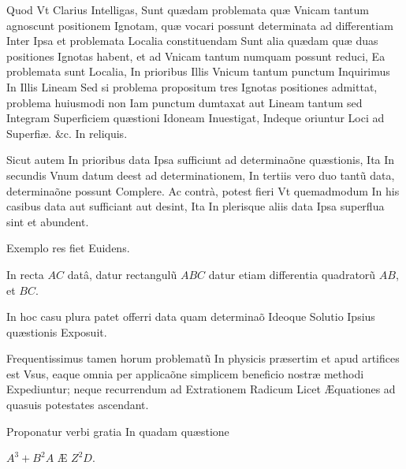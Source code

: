 \documentclass[11pt,a4paper]{article}
\begin{document}
Quod Vt Clarius Intelligas, Sunt quædam problemata quæ Vnicam tantum agnoscunt positionem Ignotam, quæ vocari possunt determinata ad differentiam Inter Ipsa et problemata Localia constituendam Sunt alia quædam quæ duas positiones Ignotas habent, et ad Vnicam tantum numquam possunt reduci, Ea problemata sunt Localia, In prioribus Illis Vnicum tantum punctum Inquirimus In Illis Lineam Sed si problema propositum tres Ignotas positiones admittat, problema huiusmodi non Iam punctum dumtaxat aut Lineam tantum sed Integram Superficiem quæstioni Idoneam Inuestigat, Indeque oriuntur Loci ad Superfiæ. \&c. In reliquis.

Sicut autem In prioribus data Ipsa sufficiunt ad determinaõne quæstionis, Ita In secundis Vnum datum deest ad determinationem, In tertiis vero duo tantũ data, determinaõne possunt Complere. Ac contrà, potest fieri Vt quemadmodum In his casibus data aut sufficiant aut desint, Ita In plerisque aliis data Ipsa superflua sint et abundent.


Exemplo res fiet Euidens.

In recta $AC$ datâ, datur rectangulũ $ABC$ datur etiam differentia quadratorũ $AB$, et $BC$.

In hoc casu plura patet offerri data quam determinaõ Ideoque Solutio Ipsius quæstionis Exposuit.

Frequentissimus tamen horum problematũ In physicis præsertim et apud artifices est Vsus, eaque omnia per applicaõne simplicem beneficio nostræ methodi Expediuntur; neque recurrendum ad Extrationem Radicum Licet Æquationes ad quasuis potestates ascendant.

Proponatur verbi gratia In quadam quæstione

$A^3 + B^2A$ Æ $Z^2D$.
\end{document}
